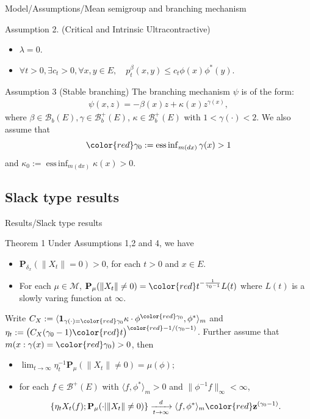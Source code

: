 \documentclass[xcolor=dvipsnames]{beamer}
\begin{document}
\begin{frame}{Model/Assumptions/Mean semigroup and branching mechanism}
\begin{block}{Assumption 2. (Critical and Intrinsic Ultracontractive)}
\begin{itemize}
\item 
  $\lambda = 0$.
\item
  $\forall t > 0, \exists c_t>0, \forall x,y \in E, \quad p_t^\beta (x,y) \leq c_t \phi(x) \phi^*(y)$.
\end{itemize}
\end{block}
\begin{block}{Assumption 3 (Stable branching)}
  The branching mechanism $\psi$ is of the form:
  \begin{align*}
    \psi(x,z)
    = -\beta (x) z + \kappa(x) z^{\gamma(x)},
  \end{align*}
  where $\beta \in \mathscr B_b(E), \gamma \in \mathscr B^+_b(E)$, $\kappa \in \mathscr B^+_b(E)$ with $1< \gamma(\cdot )<2$. 
  We also assume that 
  \[{\color{red} \gamma_0} := \operatorname{ess\,inf}_{m(dx)} \gamma(x)> 1\] and $\kappa_0:=\operatorname{ess\,inf}_{m(dx)}\kappa(x) > 0$.
\end{block}
\end{frame}

\subsection{Slack type results}
\begin{frame}{Results/Slack type results}
\begin{block}{Theorem 1}
Under Assumptions 1,2 and 4, we have
\begin{itemize}
\item[(1)]
  $\mathbf P_{\delta_x}( \| X_t\| = 0) > 0$, for each $t > 0$ and $x\in E$.
\item[(2)]
  For each $\mu \in \mathcal M$, $\mathbf P_{\mu}(\|X_t\| \neq 0) = {\color{red} t^{-\frac{1}{\gamma_0 - 1}}} L(t)$ where $L(t)$ is a slowly varing function at $\infty$.
\end{itemize}
Write $C_X := \langle \mathbf 1_{\gamma(\cdot) = {\color{red} \gamma_0}} \kappa\cdot \phi^{ \color{red} \gamma_0}, \phi^* \rangle_m$ and $\eta_t := \big( C_X(\gamma_0 - 1) {\color{red} t} \big)^{\color{red} - 1/(\gamma_0 - 1) }$. 
{\color{red} Further assume} that $m( x:\gamma(x)={\color{red}\gamma_0} )>0$, then
\begin{itemize}
\item[(3)]
$
  \lim_{t\to\infty} \eta_t^{-1}\mathbf P_{\mu}(\|X_t\| \neq 0)
  =\mu(\phi);
$
\item[(4)]
  for each $f \in \mathscr B^+(E)$ with $\langle f, \phi^* \rangle_m > 0$ and $\| \phi^{-1}f \|_\infty < \infty$,
\[
  \{\eta_t X_t(f) ; \mathbf P_{\mu}(\cdot |\|X_t\| \neq 0) \}
  \xrightarrow[t\to \infty]{d} \langle f, \phi^*\rangle_m {\color{red}\mathbf z^{(\gamma_0 - 1)}}.
\]
\end{itemize}
\end{block}
\end{frame}
\end{document}
